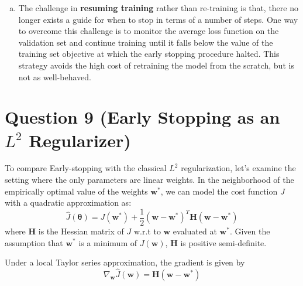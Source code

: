 \documentclass[fleqn]{article}
\begin{document}
\begin{enumerate}[a)]
	\item 
	The challenge in \textbf{resuming training} rather than re-training is that, there no longer exists a guide for when to stop in terms of a number of steps. One way to overcome this challenge is to monitor the average loss function on the validation set and continue training until it falls below the value of the training set objective at which the early stopping procedure halted. This strategy avoids the high cost of retraining the model from the scratch, but is not as well-behaved.
\end{enumerate}


\section*{Question 9 (Early Stopping as an $L^2$ Regularizer)}
\vspace{40 mm}

To compare Early-stopping with the classical $L^2$ regularization, let's examine the setting where the only parameters are linear weights. In the neighborhood of the empirically optimal value of the weights $\bm{w^*}$, we can model the cost function $J$ with a quadratic approximation as:
\begin{equation*}
	\hat{J}(\bm{\theta}) = J(\bm{w^*}) + \frac{1}{2}(\bm{w} - \bm{w^*})^T \bm{H} (\bm{w} - \bm{w^*})
\end{equation*}
where $\bm{H}$ is the Hessian matrix of $J$ w.r.t to $\bm{w}$ evaluated at $\bm{w^*}$. Given the assumption that $\bm{w^*}$ is a minimum of $J(\bm{w})$, $\bm{H}$ is positive semi-definite.

Under a local Taylor series approximation, the gradient is given by
\begin{equation*}
	\nabla_{\bm{w}} \hat{J}(\bm{w}) = \bm{H}(\bm{w} - \bm{w^*})
\end{equation*}
\end{document}
